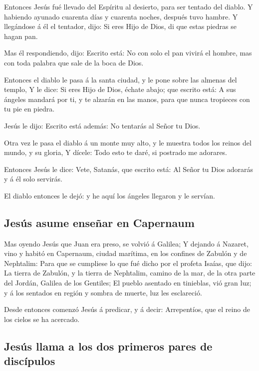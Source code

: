  Entonces Jesús fué llevado del Espíritu al desierto, para
ser tentado del diablo.  Y habiendo ayunado cuarenta días
y cuarenta noches, después tuvo hambre.  Y llegándose á él
el tentador, dijo: Si eres Hijo de Dios, di que estas piedras se hagan
pan.

 Mas él respondiendo, dijo: Escrito está: No con solo el
pan vivirá el hombre, mas con toda palabra que sale de la boca de Dios.

 Entonces el diablo le pasa á la santa ciudad, y le pone
sobre las almenas del templo,  Y le dice: Si eres Hijo de
Dios, échate abajo; que escrito está: A sus ángeles mandará por ti, y te
alzarán en las manos, para que nunca tropieces con tu pie en piedra.

 Jesús le dijo: Escrito está además: No tentarás al Señor
tu Dios.

 Otra vez le pasa el diablo á un monte muy alto, y le
muestra todos los reinos del mundo, y su gloria,  Y
dícele: Todo esto te daré, si postrado me adorares.

 Entonces Jesús le dice: Vete, Satanás, que escrito está:
Al Señor tu Dios adorarás y á él solo servirás.

 El diablo entonces le dejó: y he aquí los ángeles
llegaron y le servían.

\hypertarget{jesuxfas-asume-enseuxf1ar-en-capernaum}{%
\subsection{Jesús asume enseñar en
Capernaum}\label{jesuxfas-asume-enseuxf1ar-en-capernaum}}

 Mas oyendo Jesús que Juan era preso, se volvió á
Galilea;  Y dejando á Nazaret, vino y habitó en
Capernaum, ciudad marítima, en los confines de Zabulón y de Nephtalim:
 Para que se cumpliese lo que fué dicho por el profeta
Isaías, que dijo:  La tierra de Zabulón, y la tierra de
Nephtalim, camino de la mar, de la otra parte del Jordán, Galilea de los
Gentiles;  El pueblo asentado en tinieblas, vió gran luz;
y á los sentados en región y sombra de muerte, luz les esclareció.

 Desde entonces comenzó Jesús á predicar, y á decir:
Arrepentíos, que el reino de los cielos se ha acercado.

\hypertarget{jesuxfas-llama-a-los-dos-primeros-pares-de-discuxedpulos}{%
\subsection{Jesús llama a los dos primeros pares de
discípulos}\label{jesuxfas-llama-a-los-dos-primeros-pares-de-discuxedpulos}}

